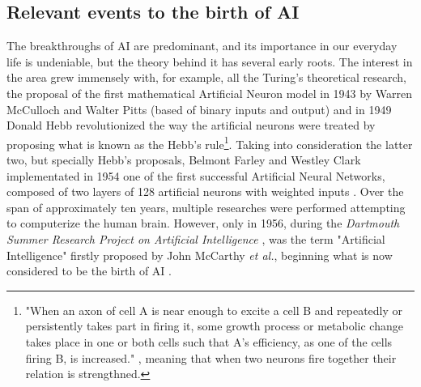 \documentclass[12pt]{article}
\begin{document}
\subsection{Relevant events to the birth of AI}
\par The breakthroughs of AI are predominant, and its importance in our everyday life is undeniable, but the theory behind it has several early roots. The interest in the area grew immensely with, for example, all the Turing's theoretical research, the proposal of the first mathematical Artificial Neuron model in 1943 by Warren McCulloch and Walter Pitts (based of binary inputs and output) \autocite{mccullochLOGICALCALCULUSIDEAS} and in 1949 Donald Hebb revolutionized the way the artificial neurons were treated by proposing what is known as the Hebb's rule\footnote{"When an axon of cell A is near enough to excite a cell B and repeatedly or persistently takes part in firing it, some growth process or metabolic change takes place in one or both cells such that A’s efficiency, as one of the cells firing B, is increased." \autocite{hebbOrganizationBehaviorNeuropsychological1949}, meaning that when two neurons fire together their relation is strengthned.}. Taking into consideration the latter two, but specially Hebb's proposals, Belmont Farley and Westley Clark implementated in 1954 one of the first successful Artificial Neural Networks, composed of two layers of 128 artificial neurons with weighted inputs \autocite{farleySimulationSelforganizingSystems1954}. Over the span of approximately ten years, multiple researches were performed attempting to computerize the human brain. However, only in 1956, during the \textit{Dartmouth Summer Research Project on Artificial Intelligence} \autocite{mccarthyPROPOSALDARTMOUTHSUMMER}, was the term "Artificial Intelligence" firstly proposed by John McCarthy \textit{et al.}, beginning what is now considered to be the birth of AI \autocite{zhangStudyArtificialIntelligence2021}.  
\end{document}
